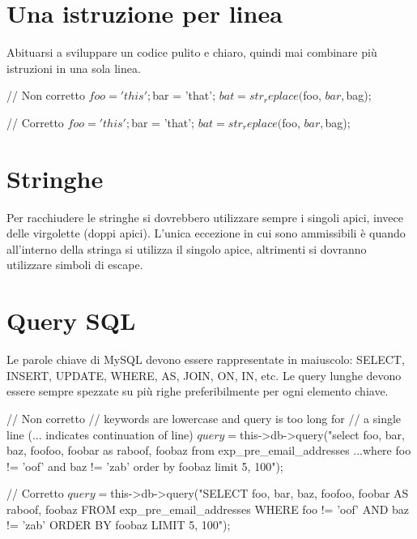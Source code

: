 
\section{Una istruzione per linea}
Abituarsi a sviluppare un codice pulito e chiaro, quindi mai combinare più istruzioni in una sola linea.

\begin{code}
// Non corretto
$foo = 'this'; $bar = 'that'; $bat = str_replace($foo, $bar, $bag);

// Corretto
$foo = 'this';
$bar = 'that';
$bat = str_replace($foo, $bar, $bag);
\end{code}

\section{Stringhe}
Per racchiudere le stringhe si dovrebbero utilizzare sempre i singoli apici, invece delle virgolette (doppi apici). L'unica eccezione in cui sono ammissibili è quando all'interno della stringa si utilizza il singolo apice, altrimenti si dovranno utilizzare simboli di escape.


\section{Query SQL}
Le parole chiave di MySQL devono essere rappresentate in maiuscolo: SELECT, INSERT, UPDATE, WHERE, AS, JOIN, ON, IN, etc. Le query lunghe devono essere sempre spezzate su più righe preferibilmente per ogni elemento chiave.

\begin{code}
// Non corretto
// keywords are lowercase and query is too long for
// a single line (... indicates continuation of line)
$query = $this->db->query("select foo, bar, baz, foofoo, foobar as raboof, foobaz from exp_pre_email_addresses
...where foo != 'oof' and baz != 'zab' order by foobaz limit 5, 100");

// Corretto
$query = $this->db->query("SELECT foo, bar, baz, foofoo, foobar AS raboof, foobaz
				FROM exp_pre_email_addresses
				WHERE foo != 'oof'
				AND baz != 'zab'
				ORDER BY foobaz
				LIMIT 5, 100");
\end{code}

